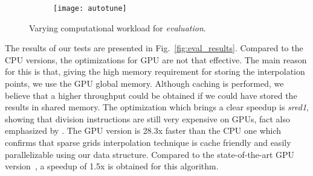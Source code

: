 \begin{figure}[t]
  \begin{subfigure}[b]{1\linewidth}
    \centering
    \texttt{[image: autotune]}
  \end{subfigure}
  \caption{Varying computational workload for \textit{evaluation}.}
  \label{fig:autotune}
\end{figure}


The results of our tests are presented in Fig.~\ref{fig:eval_results}. Compared
to the CPU versions, the optimizations for GPU are not that effective. The main
reason for this is that, giving the high memory requirement for storing the
interpolation points, we use the GPU global memory. Although caching is
performed, we believe that a higher throughput could be obtained if we could
have stored the results in shared memory. The optimization which brings a clear
speedup is \textit{sred1}, showing that division instructions are still very
expensive on GPUs, fact also emphasized by \cite{cuda}. The GPU version is 28.3x
faster than the CPU one which confirms that sparse grids interpolation technique
is cache friendly and easily parallelizable using our data structure. Compared
to the state-of-the-art GPU version~\cite{Murarasu:2011:CDS:1941553.1941559}, a
speedup of 1.5x is obtained for this algorithm.
